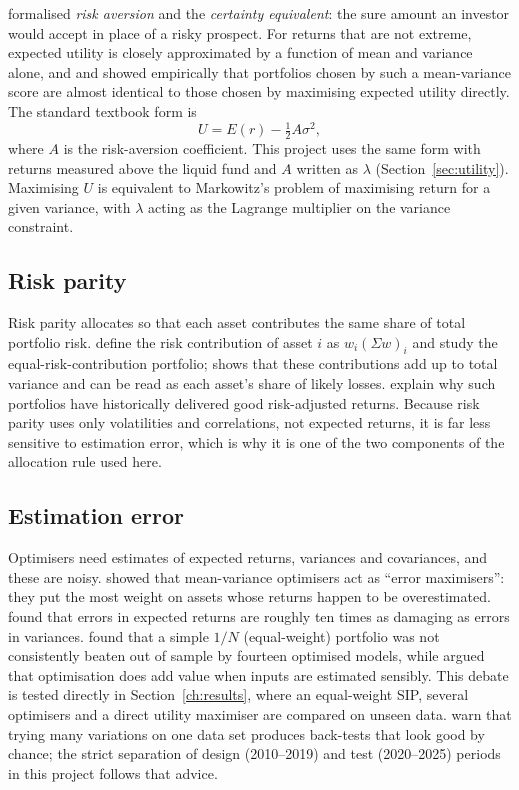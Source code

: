 \citet{pratt1964} formalised \emph{risk aversion} and the \emph{certainty equivalent}: the sure
amount an investor would accept in place of a risky prospect. For returns that are not extreme,
expected utility is closely approximated by a function of mean and variance alone, and
\citet{levy1979} and \citet{kroll1984} showed empirically that portfolios chosen by such a
mean-variance score are almost identical to those chosen by maximising expected utility directly.
The standard textbook form \citep{bkm2021} is
\begin{equation*}
  U = E(r) - \tfrac{1}{2}A\sigma^2 ,
\end{equation*}
where $A$ is the risk-aversion coefficient. This project uses the same form with returns measured
above the liquid fund and $A$ written as $\lambda$ (Section~\ref{sec:utility}). Maximising $U$ is
equivalent to Markowitz's problem of maximising return for a given variance, with $\lambda$ acting
as the Lagrange multiplier on the variance constraint.

\subsection{Risk parity}

Risk parity allocates so that each asset contributes the same share of total portfolio risk.
\citet{maillard2010} define the risk contribution of asset $i$ as $w_i(\Sigma w)_i$ and study the
equal-risk-contribution portfolio; \citet{qian2006} shows that these contributions add up to total
variance and can be read as each asset's share of likely losses. \citet{asness2012} explain why such
portfolios have historically delivered good risk-adjusted returns. Because risk parity uses only
volatilities and correlations, not expected returns, it is far less sensitive to estimation error,
which is why it is one of the two components of the allocation rule used here.

\subsection{Estimation error}

Optimisers need estimates of expected returns, variances and covariances, and these are noisy.
\citet{michaud1989} showed that mean-variance optimisers act as ``error maximisers'': they put the
most weight on assets whose returns happen to be overestimated. \citet{chopra1993} found that errors
in expected returns are roughly ten times as damaging as errors in variances. \citet{demiguel2009}
found that a simple $1/N$ (equal-weight) portfolio was not consistently beaten out of sample by
fourteen optimised models, while \citet{kritzman2010} argued that optimisation does add value when
inputs are estimated sensibly. This debate is tested directly in Section~\ref{ch:results}, where an
equal-weight SIP, several optimisers and a direct utility maximiser are compared on unseen data.
\citet{bailey2014} warn that trying many variations on one data set produces back-tests that look
good by chance; the strict separation of design (2010--2019) and test (2020--2025) periods in this
project follows that advice.

